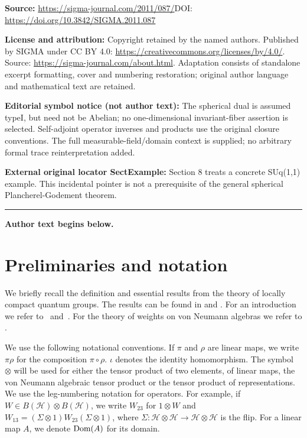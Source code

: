 \documentclass[11pt]{article}
\numberwithin{equation}{section}
\theoremstyle{definition}
\newcommand{\cHil}{\mathcal{H}}
\newcommand{\Dom}{\text{\rm Dom}}
\begin{document}
\noindent\textbf{Source:} \url{https://sigma-journal.com/2011/087/}\quad DOI: \url{https://doi.org/10.3842/SIGMA.2011.087}\par
\noindent\textbf{License and attribution:} Copyright retained by the named authors. Published by SIGMA under CC BY 4.0: \url{https://creativecommons.org/licenses/by/4.0/}. Source: \url{https://sigma-journal.com/about.html}. Adaptation consists of standalone excerpt formatting, cover and numbering restoration; original author language and mathematical text are retained.\par
\noindent\textbf{Editorial symbol notice (not author text):} The spherical dual is assumed typeI, but need not be Abelian; no one-dimensional invariant-fiber assertion is selected. Self-adjoint operator inverses and products use the original closure conventions. The full measurable-field/domain context is supplied; no arbitrary formal trace reinterpretation added.\par
\noindent\textbf{External original locator SectExample:} Section 8 treats a concrete SUq(1,1) example. This incidental pointer is not a prerequisite of the general spherical Plancherel-Godement theorem.\par
\medskip\hrule\medskip\noindent\textbf{Author text begins below.}\par
\setcounter{section}{1}
\setcounter{subsection}{0}
\setcounter{subsubsection}{0}
\setcounter{thm}{0}
\setcounter{equation}{0}
\section{Preliminaries and notation}\label{SectPreliminaries}

We brief\/ly recall the def\/inition and essential results from the theory of locally compact quantum groups. The results can be found in \cite{KusVae, KusVaeII} and \cite{Kus}. For an introduction we refer to~\cite{Tim} and~\cite{KusLec}. For the theory of weights on von Neumann algebras we refer to \cite{TakII}.



We use the following notational conventions. If $\pi$ and $\rho$ are linear maps, we write $\pi\rho$ for the composition $\pi \circ \rho$. $\iota$ denotes the identity homomorphism. The symbol $\otimes$ will be used for either the tensor product of two elements, of linear maps, the von Neumann algebraic tensor product or the tensor product of representations. We use the leg-numbering notation for operators. For example, if $W \in B(\cHil) \otimes B(\cHil)$, we write $W_{23}$ for $1 \otimes W$ and $W_{13} = (\Sigma \otimes 1) W_{23}(\Sigma \otimes 1)$, where $\Sigma: \cHil \otimes \cHil \rightarrow \cHil \otimes \cHil$ is the f\/lip.  For a linear map $A$, we denote $\Dom(A)$ for its domain.
\end{document}
